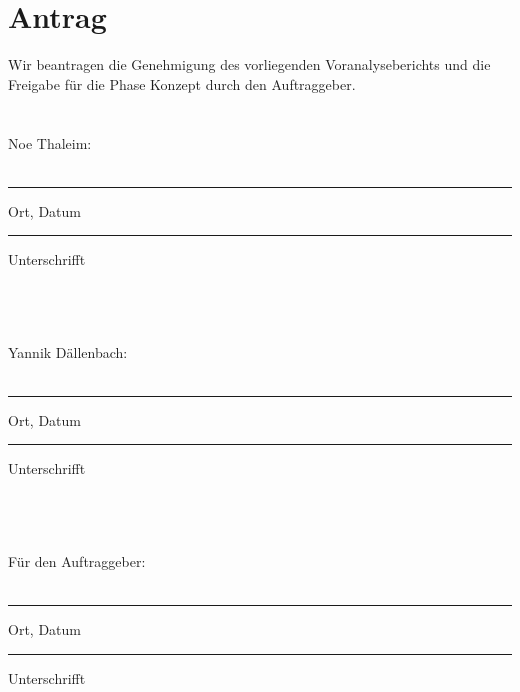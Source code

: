 \pagebreak
\section{Antrag}
	Wir beantragen die Genehmigung des vorliegenden Voranalyseberichts und die Freigabe für die Phase Konzept durch den Auftraggeber.
	\\ \\ \\
	Noe Thaleim:
	\\ \\
	\parbox{4cm}{\hrule
	\strut \centering\footnotesize Ort, Datum} \hfill\parbox{4cm}{\hrule
	\strut \centering\footnotesize Unterschrifft}
	\\ \\ \\
	Yannik Dällenbach:
	\\ \\
	\parbox{4cm}{\hrule
	\strut \centering\footnotesize Ort, Datum} \hfill\parbox{4cm}{\hrule
	\strut \centering\footnotesize Unterschrifft}
	\\ \\ \\
	Für den Auftraggeber:
	\\ \\
	\parbox{4cm}{\hrule
	\strut \centering\footnotesize Ort, Datum} \hfill\parbox{4cm}{\hrule
	\strut \centering\footnotesize Unterschrifft}